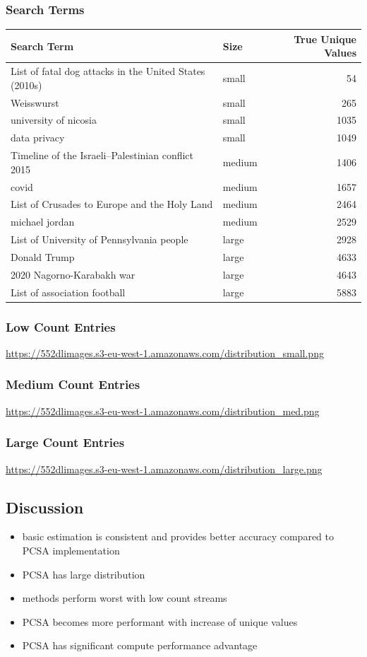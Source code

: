 \documentclass[11pt]{article}
\begin{document}
\subsubsection*{Search Terms}
\label{sec:orgbdfce25}
\begin{center}
\begin{tabular}{llr}
Search Term & Size & True Unique Values\\
\hline
List of fatal dog attacks in the United States (2010s) & small & 54\\
Weisswurst & small & 265\\
university of nicosia & small & 1035\\
data privacy & small & 1049\\
Timeline of the Israeli–Palestinian conflict 2015 & medium & 1406\\
covid & medium & 1657\\
List of Crusades to Europe and the Holy Land & medium & 2464\\
michael jordan & medium & 2529\\
List of University of Pennsylvania people & large & 2928\\
Donald Trump & large & 4633\\
2020 Nagorno-Karabakh war & large & 4643\\
List of association football & large & 5883\\
\end{tabular}
\end{center}


\subsubsection*{Low Count Entries}
\label{sec:org06a9d4b}
\url{https://552dlimages.s3-eu-west-1.amazonaws.com/distribution\_small.png}
\subsubsection*{Medium Count Entries}
\label{sec:org6f4cbec}
\url{https://552dlimages.s3-eu-west-1.amazonaws.com/distribution\_med.png}
\subsubsection*{Large Count Entries}
\label{sec:org7accdc0}
\url{https://552dlimages.s3-eu-west-1.amazonaws.com/distribution\_large.png}
\subsection*{Discussion}
\label{sec:org703b094}
\begin{itemize}
\item basic estimation is consistent and provides better accuracy compared to PCSA implementation
\item PCSA has large distribution
\item methods perform worst with low count streams
\item PCSA becomes more performant with increase of unique values
\item PCSA has significant compute performance advantage
\end{itemize}
\end{document}
